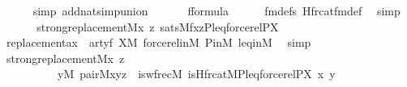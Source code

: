 \begin{isabellebody}
\ \ \ \ \isamarkupfalse%
\ {\isacharparenleft}{\kern0pt}simp\ add{\isacharcolon}{\kern0pt}nat{\isacharunderscore}{\kern0pt}simp{\isacharunderscore}{\kern0pt}union{\isacharparenright}{\kern0pt}\isanewline
\ \ \isamarkupfalse%
\isanewline
\ \ \isamarkupfalse%
\ {\isachardoublequoteopen}{\isacharquery}{\kern0pt}f{\isasymin}formula{\isachardoublequoteclose}\isanewline
\ \ \ \ \isamarkupfalse%
\ fm{\isacharunderscore}{\kern0pt}defs\ Hfrc{\isacharunderscore}{\kern0pt}at{\isacharunderscore}{\kern0pt}fm{\isacharunderscore}{\kern0pt}def\ \isamarkupfalse%
\ simp\isanewline
\ \ \isamarkupfalse%
\isanewline
\ \ \isamarkupfalse%
\ {\isachardoublequoteopen}strong{\isacharunderscore}{\kern0pt}replacement{\isacharparenleft}{\kern0pt}{\isacharhash}{\kern0pt}{\isacharhash}{\kern0pt}M{\isacharcomma}{\kern0pt}{\isasymlambda}x\ z{\isachardot}{\kern0pt}\ sats{\isacharparenleft}{\kern0pt}M{\isacharcomma}{\kern0pt}{\isacharquery}{\kern0pt}f{\isacharcomma}{\kern0pt}{\isacharbrackleft}{\kern0pt}x{\isacharcomma}{\kern0pt}z{\isacharcomma}{\kern0pt}P{\isacharcomma}{\kern0pt}leq{\isacharcomma}{\kern0pt}forcerel{\isacharparenleft}{\kern0pt}P{\isacharcomma}{\kern0pt}X{\isacharparenright}{\kern0pt}{\isacharbrackright}{\kern0pt}{\isacharparenright}{\kern0pt}{\isacharparenright}{\kern0pt}{\isachardoublequoteclose}\isanewline
\ \ \ \ \isamarkupfalse%
\ replacement{\isacharunderscore}{\kern0pt}ax\ {}\ artyf\ {\isacartoucheopen}X{\isasymin}M{\isacartoucheclose}\ forcerel{\isacharunderscore}{\kern0pt}in{\isacharunderscore}{\kern0pt}M\ P{\isacharunderscore}{\kern0pt}in{\isacharunderscore}{\kern0pt}M\ leq{\isacharunderscore}{\kern0pt}in{\isacharunderscore}{\kern0pt}M\ \isamarkupfalse%
\ simp\isanewline
\ \ \isamarkupfalse%
\isanewline
\ \ \isamarkupfalse%
\ {\isachardoublequoteopen}strong{\isacharunderscore}{\kern0pt}replacement{\isacharparenleft}{\kern0pt}{\isacharhash}{\kern0pt}{\isacharhash}{\kern0pt}M{\isacharcomma}{\kern0pt}{\isasymlambda}x\ z{\isachardot}{\kern0pt}\isanewline
\ \ \ \ \ \ \ \ \ \ {\isasymexists}y{\isasymin}M{\isachardot}{\kern0pt}\ pair{\isacharparenleft}{\kern0pt}{\isacharhash}{\kern0pt}{\isacharhash}{\kern0pt}M{\isacharcomma}{\kern0pt}x{\isacharcomma}{\kern0pt}y{\isacharcomma}{\kern0pt}z{\isacharparenright}{\kern0pt}\ {\isacharampersand}{\kern0pt}\ is{\isacharunderscore}{\kern0pt}wfrec{\isacharparenleft}{\kern0pt}{\isacharhash}{\kern0pt}{\isacharhash}{\kern0pt}M{\isacharcomma}{\kern0pt}\ is{\isacharunderscore}{\kern0pt}Hfrc{\isacharunderscore}{\kern0pt}at{\isacharparenleft}{\kern0pt}{\isacharhash}{\kern0pt}{\isacharhash}{\kern0pt}M{\isacharcomma}{\kern0pt}P{\isacharcomma}{\kern0pt}leq{\isacharparenright}{\kern0pt}{\isacharcomma}{\kern0pt}forcerel{\isacharparenleft}{\kern0pt}P{\isacharcomma}{\kern0pt}X{\isacharparenright}{\kern0pt}{\isacharcomma}{\kern0pt}\ x{\isacharcomma}{\kern0pt}\ y{\isacharparenright}{\kern0pt}{\isacharparenright}{\kern0pt}{\isachardoublequoteclose}\isanewline

\end{isabellebody}
